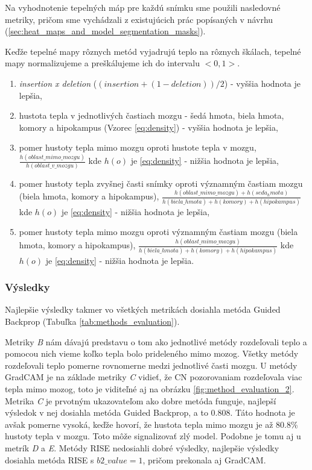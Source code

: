 Na vyhodnotenie tepelných máp pre každú snímku sme použili nasledovné metriky, pričom sme vychádzali z existujúcich prác popísaných v návrhu (\ref{sec:heat_maps_and_model_segmentation_masks}). 

Keďže tepelné mapy rôznych metód vyjadrujú teplo na rôznych škálach, tepelné mapy normalizujeme a preškálujeme ich do intervalu $<0, 1>$.

\begin{enumerate}[label=\Alph*]
    \item \textit{insertion x deletion} ($(insertion + (1 - deletion)) / 2$) - vyššia hodnota je lepšia,
    \item hustota tepla v jednotlivých častiach mozgu - šedá hmota, biela hmota, komory a hipokampus (Vzorec \ref{eq:density}) - vyššia hodnota je lepšia,
    \item pomer hustoty tepla mimo mozgu oproti hustote tepla v mozgu, \\ $\frac{h(oblast\_mimo\_mozgu)}{h(oblast\_v\_mozgu)}$ kde $h(o)$ je \eqref{eq:density} - nižšia hodnota je lepšia,
    \item pomer hustoty tepla zvyšnej časti snímky oproti významným častiam mozgu (biela hmota, komory a hipokampus), $\frac{h(oblast\_mimo\_mozgu) + h(seda_hmota)}{h(biela\_hmota) + h(komory) + h(hipokampus)}$ kde $h(o)$ je \eqref{eq:density} - nižšia hodnota je lepšia,
    \item pomer hustoty tepla mimo mozgu oproti významným častiam mozgu (biela hmota, komory a hipokampus), $\frac{h(oblast\_mimo\_mozgu)}{h(biela\_hmota) + h(komory) + h(hipokampus)}$ kde $h(o)$ je \eqref{eq:density} - nižšia hodnota je lepšia.
\end{enumerate}

\subsubsection{Výsledky \label{sec:verification_experiments_results}}

Najlepšie výsledky takmer vo všetkých metrikách dosiahla metóda Guided Backprop (Tabuľka \ref{tab:methods_evaluation}). 

Metriky \textit{B} nám dávajú predstavu o tom ako jednotlivé metódy rozdeľovali teplo a pomocou nich vieme koľko tepla bolo prideleného mimo mozog. Všetky metódy rozdeľovali teplo pomerne rovnomerne medzi jednotlivé časti mozgu. U metódy GradCAM je na základe metriky \textit{C} vidieť, že CN pozorovaniam rozdeľovala viac tepla mimo mozog, toto je viditeľné aj na obrázku \ref{fig:method_evaluation_2}. Metrika \textit{C} je prvotným ukazovateľom ako dobre metóda funguje, najlepší výsledok v nej dosiahla metóda Guided Backprop, a to $0.808$. Táto hodnota je avšak pomerne vysoká, keďže hovorí, že hustota tepla mimo mozgu je až 80.8\% hustoty tepla v mozgu. Toto môže signalizovať zlý model. Podobne je tomu aj u metrík \textit{D} a \textit{E}. Metódy RISE nedosiahli dobré výsledky, najlepšie výsledky dosiahla metóda RISE s $b2\_value = 1$, pričom prekonala aj GradCAM.


